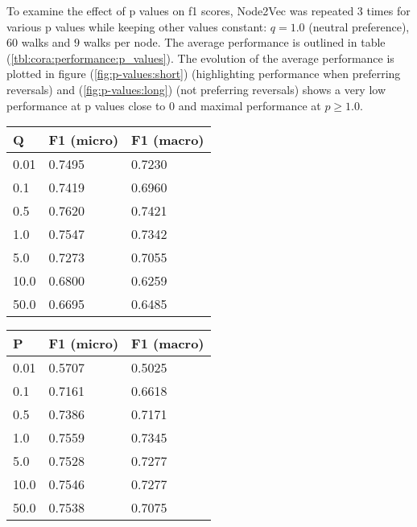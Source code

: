 \documentclass[a4paper,10pt]{article}
\begin{document}
To examine the effect of p values on f1 scores, Node2Vec was repeated 3 times for various p values while keeping other values constant: $q = 1.0$ (neutral preference), $60$ walks and $9$ walks per node. The average performance is outlined in table (\ref{tbl:cora:performance:p_values}). The evolution of the average performance is plotted in figure (\ref{fig:p-values:short}) (highlighting performance when preferring reversals) and (\ref{fig:p-values:long}) (not preferring reversals) shows a very low performance at p values close to $0$ and maximal performance at $p \ge 1.0$.

\begin{minipage}[c][18em][c]{0.48\textwidth}
  \begin{tabular}{m{4em} m{7em} m{7em}}
    \hline
    Q & F1 (micro)  & F1 (macro) \\ \hline\hline
    0.01	& 0.7495	& 0.7230 \\ \hline
    0.1	& 0.7419	& 0.6960 \\ \hline
    0.5	& 0.7620	& 0.7421 \\ \hline
    1.0	& 0.7547	& 0.7342 \\ \hline
    5.0	& 0.7273	& 0.7055 \\ \hline
    10.0	& 0.6800	& 0.6259 \\ \hline
    50.0	& 0.6695	& 0.6485 \\ \hline
  \end{tabular}
  \label{tbl:cora:performance:q_values}
\end{minipage}
\hfill
\begin{minipage}[c][18em][c]{0.48\textwidth}
  \begin{tabular}{m{4em} m{7em} m{7em}}
    \hline
    P & F1 (micro)  & F1 (macro) \\
    \hline\hline
    0.01	& 0.5707	& 0.5025 \\ \hline
    0.1	& 0.7161	& 0.6618 \\ \hline
    0.5	& 0.7386	& 0.7171 \\ \hline
    1.0	& 0.7559	& 0.7345 \\ \hline
    5.0	& 0.7528	& 0.7277 \\ \hline
    10.0	& 0.7546	& 0.7277 \\ \hline
    50.0	& 0.7538	& 0.7075 \\ \hline
  \end{tabular}
  \label{tbl:cora:performance:p_values}
\end{minipage}
\end{document}
